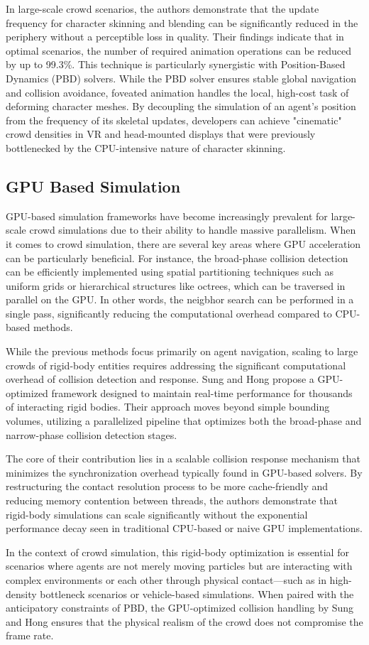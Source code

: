 In large-scale crowd scenarios, the authors demonstrate that the update frequency for character skinning and blending can be significantly reduced in the periphery without a perceptible loss in quality. Their findings indicate that in optimal scenarios, the number of required animation operations can be reduced by up to 99.3\%. This technique is particularly synergistic with Position-Based Dynamics (PBD) solvers. While the PBD solver ensures stable global navigation and collision avoidance, foveated animation handles the local, high-cost task of deforming character meshes. By decoupling the simulation of an agent's position from the frequency of its skeletal updates, developers can achieve "cinematic" crowd densities in VR and head-mounted displays that were previously bottlenecked by the CPU-intensive nature of character skinning.

\subsection{GPU Based Simulation} %
GPU-based simulation frameworks have become increasingly prevalent for large-scale crowd simulations due to their ability to handle massive parallelism. When it comes to crowd simulation, there are several key areas where GPU acceleration can be particularly beneficial. For instance, the broad-phase collision detection can be efficiently implemented using spatial partitioning techniques such as uniform grids or hierarchical structures like octrees, which can be traversed in parallel on the GPU. In other words, the neigbhor search can be performed in a single pass, significantly reducing the computational overhead compared to CPU-based methods. 

While the previous methods focus primarily on agent navigation, scaling to large crowds of rigid-body entities requires addressing the significant computational overhead of collision detection and response. Sung and Hong \cite{sung} propose a GPU-optimized framework designed to maintain real-time performance for thousands of interacting rigid bodies. Their approach moves beyond simple bounding volumes, utilizing a parallelized pipeline that optimizes both the broad-phase and narrow-phase collision detection stages.

The core of their contribution lies in a scalable collision response mechanism that minimizes the synchronization overhead typically found in GPU-based solvers. By restructuring the contact resolution process to be more cache-friendly and reducing memory contention between threads, the authors demonstrate that rigid-body simulations can scale significantly without the exponential performance decay seen in traditional CPU-based or naive GPU implementations.

In the context of crowd simulation, this rigid-body optimization is essential for scenarios where agents are not merely moving particles but are interacting with complex environments or each other through physical contact—such as in high-density bottleneck scenarios or vehicle-based simulations. When paired with the anticipatory constraints of PBD, the GPU-optimized collision handling by Sung and Hong \cite{sung} ensures that the physical realism of the crowd does not compromise the frame rate.